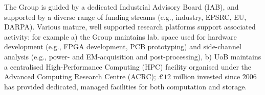 %
% 
%
% 
% 
%

The Group is guided by a dedicated Industrial Advisory Board (IAB), and
supported by a diverse range of funding streams (e.g., industry, EPSRC, 
EU, DARPA).  Various mature, well supported research platforms support 
associated activity: for example
a) the Group maintains 
   lab. space used for 
   hardware development  (e.g., FPGA development, PCB prototyping)
   and
   side-channel analysis (e.g., power- and EM-acquisition and post-processing),
b) UoB       maintains 
   a centralised High-Performance Computing (HPC) facility organised 
   under the Advanced Computing Research Centre (ACRC); $\pounds 12$ 
   million invested since $2006$ has provided dedicated, managed
   facilities for both computation and storage.


